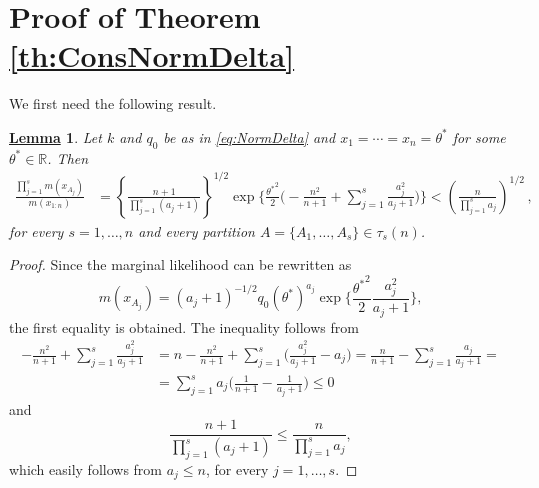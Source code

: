 \documentclass[12pt]{article}
\newtheorem{Lem}{\underline{\bf Lemma}}
\def \R {\mathbb{R} }
\begin{document}
\section{Proof of Theorem \ref{th:ConsNormDelta}}%
We first need the following result.
\begin{Lem}\label{lemma:m_mratio_Gauss}
Let $k$ and $q_0$ be as in \eqref{eq:NormDelta} and $x_1=\cdots=x_n=\theta^\ast$ for some $\theta^\ast \in\R$. Then
\begin{align*}
\frac{\prod_{j=1}^{s}m(x_{A_j})}{m(x_{1:n})} &= \left\{\frac{n+1}{\prod_{j=1}^{s} (a_j+1)} \right\}^{1/2} \exp\bigg\{\frac{{\theta^\ast}^2}{2} \bigg(- \frac{n^2}{n+1} + \sum_{j=1}^{s} \frac{a_j^2}{a_j+1} \bigg) \bigg\}
< \left(\frac{n}{\prod_{j=1}^{s} a_j} \right)^{1/2}\,,
\end{align*}
for every $s=1,\dots,n$ and every partition $A=\{A_1,\ldots,A_s\} \in \tau_s(n)$.
\end{Lem}
\begin{proof}
Since the marginal likelihood can be rewritten as
\begin{equation*}
m(x_{A_j})= (a_j+1)^{-1/2} q_0(\theta^\ast)^{a_j} \exp\bigg\{\frac{{\theta^\ast}^2}{2} \frac{a_j^2}{a_j+1} \bigg\},
\end{equation*}
the first equality is obtained. The inequality follows from
\[
\begin{aligned}
- \frac{n^2}{n+1} + \sum_{j=1}^{s} \frac{a_j^2}{a_j+1} &= n - \frac{n^2}{n+1} + \sum_{j=1}^{s} \bigg(\frac{a_j^2}{a_j+1} -a_j \bigg) =  \frac{n}{n+1} - \sum_{j=1}^{s} \frac{a_j}{a_j+1} = \\
& = \sum_{j=1}^{s} a_j \bigg(\frac{1}{n+1} -\frac{1}{a_j+1} \bigg) \le 0
\end{aligned}
\]
and
\[
\frac{n+1}{\prod_{j=1}^{s} (a_j+1)} \leq \frac{n}{\prod_{j=1}^{s} a_j},
\]
which easily follows from $a_j \leq n$, for every $j = 1, \dots, s$.
\end{proof}
\end{document}
